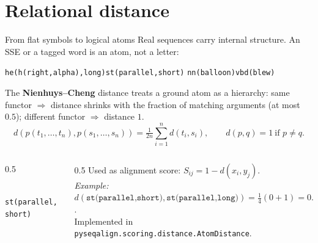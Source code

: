 \documentclass[aspectratio=169,10pt]{beamer}
\newcommand{\code}[1]{\texttt{\small #1}}
\newcommand{\atom}[1]{\texttt{#1}}
\begin{document}
\section{Relational distance}
\begin{frame}{From flat symbols to logical atoms}
  Real sequences carry internal structure. An SSE or a tagged word is an
  \alert{atom}, not a letter:
  \begin{center}\small
    \atom{he(h(right,alpha),long)}\qquad \atom{st(parallel,short)}\qquad
    \atom{nn(balloon)}\qquad \atom{vbd(blew)}
  \end{center}
  \vspace{0.3em}
  The \textbf{Nienhuys--Cheng} distance treats a ground atom as a hierarchy:
  same functor $\Rightarrow$ distance shrinks with the fraction of matching
  arguments (at most $0.5$); different functor $\Rightarrow$ distance $1$.
  \[
    d(p(t_1,\dots,t_n),p(s_1,\dots,s_n))=\tfrac{1}{2n}\sum_{i=1}^{n} d(t_i,s_i),
    \qquad d(p,q)=1\ \text{if } p\neq q .
  \]
  \begin{columns}[c]
    \begin{column}{0.5\textwidth}
      \centering
      \\[-0.2em]
      {\scriptsize \atom{st(parallel,short)}}
    \end{column}
    \begin{column}{0.5\textwidth}
      \small
      Used as alignment score: $S_{ij}=1-d(x_i,y_j)$.
      \\[0.3em]
      \emph{Example:} $d(\atom{st(parallel,short)},\atom{st(parallel,long)})
        =\tfrac{1}{4}(0+1)=0.25 \Rightarrow S=0.75$.
      \\[0.3em]
      Implemented in \code{pyseqalign.scoring.distance.AtomDistance}.
    \end{column}
  \end{columns}
\end{frame}

\end{document}
